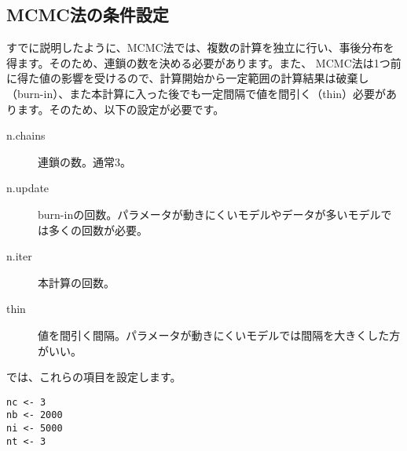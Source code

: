 	\subsection{MCMC法の条件設定}
すでに説明したように、MCMC法では、複数の計算を独立に行い、事後分布を得ます。そのため、連鎖の数を決める必要があります。また、
MCMC法は1つ前に得た値の影響を受けるので、計算開始から一定範囲の計算結果は破棄し（burn-in）、また本計算に入った後でも一定間隔で値を間引く（thin）必要があります。そのため、以下の設定が必要です。
\begin{description}
\item[n.chains]連鎖の数。通常3。
\item[n.update]burn-inの回数。パラメータが動きにくいモデルやデータが多いモデルでは多くの回数が必要。
\item[n.iter]本計算の回数。
\item[thin]値を間引く間隔。パラメータが動きにくいモデルでは間隔を大きくした方がいい。
\end{description}
では、これらの項目を設定します。
\begin{verbatim}
nc <- 3
nb <- 2000
ni <- 5000
nt <- 3
\end{verbatim}

